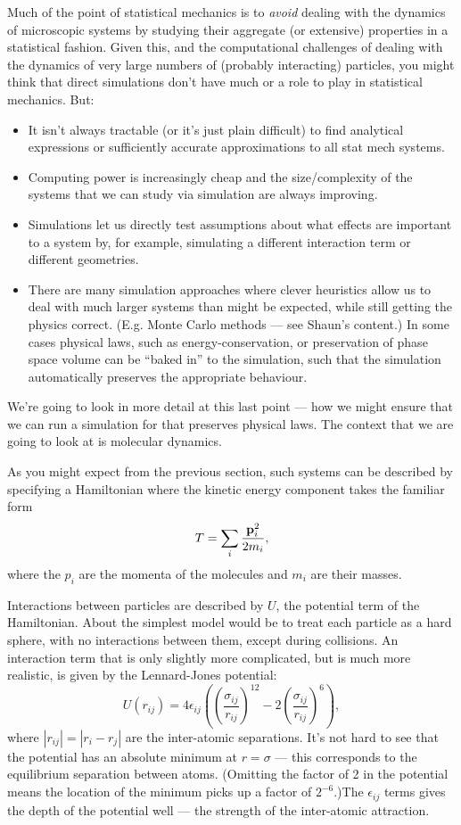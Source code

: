 \documentclass{article}
\begin{document}
Much of the point of statistical mechanics is to \emph{avoid} dealing with the dynamics of microscopic systems by studying their aggregate (or extensive) properties in a statistical fashion. Given this, and the computational challenges of dealing with the dynamics of very large numbers of (probably interacting) particles, you might think that direct simulations don't have much or a role to play in statistical mechanics. But:
\begin{itemize}
	\item It isn't always tractable (or it's just plain difficult) to find analytical expressions or sufficiently accurate approximations to all stat mech systems.
	\item Computing power is increasingly cheap and the size/complexity of the systems that we can study via simulation are always improving.
	\item Simulations let us directly test assumptions about what effects are important to a system by, for example, simulating a different interaction term or different geometries.
	\item There are many simulation approaches where clever heuristics allow us to deal with much larger systems than might be expected, while still getting the physics correct. (E.g. Monte Carlo methods --- see Shaun's content.) In some cases physical laws, such as energy-conservation, or preservation of phase space volume can be ``baked in'' to the simulation, such that the simulation automatically preserves the appropriate behaviour.
\end{itemize}

We're going to look in more detail at this last point --- how we might ensure that we can run a simulation for  that preserves physical laws. The context that we are going to look at is molecular dynamics.

As you might expect from the previous section, such systems can be described by specifying a Hamiltonian where the kinetic energy component takes the familiar form
$$ T = \sum_i \frac{{\bf p}_i^2}{2m_i},$$
where the $p_i$ are the momenta of the molecules and $m_i$ are their masses.

Interactions between particles are described by $U$, the potential term of the Hamiltonian. About the simplest model would be to treat each particle as a hard sphere, with no interactions between them, except during collisions.
An interaction term that is only slightly more complicated, but is much more realistic, is given by the Lennard-Jones potential:
$$
	U(r_{ij}) = 4\epsilon_{ij}\left(\left(\frac{\sigma_{ij}}{r_{ij}}\right)^{12} - 2\left(\frac{\sigma_{ij}}{r_{ij}}\right)^{6}\right),
$$
where $|r_{ij}| = |r_i-r_j|$ are the inter-atomic separations. It's not hard to see that the potential has an absolute minimum at $r = \sigma$ --- this corresponds to the equilibrium separation between atoms. (Omitting the factor of 2 in the potential means the location of the minimum picks up a factor of $2^{-6}$.)The $\epsilon_{ij}$ terms gives the depth of the potential well --- the strength of the inter-atomic attraction. 
\end{document}
